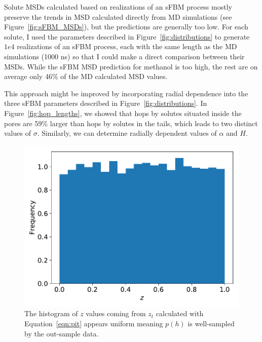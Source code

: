 \documentclass{article}
\begin{document}
  Solute MSDs calculated based on realizations of an sFBM process mostly
  preserve the trends in MSD calculated directly from MD simulations (see
  Figure~\ref{fig:sFBM_MSDs}), but the predictions are generally too low. 
  For each solute, I used the parameters described in Figure~\ref{fig:distributions}
  to generate $1e4$ realizations of an sFBM process, each with the same
  length as the MD simulations (1000 ns) so that I could make a direct 
  comparison between their MSDs. While the sFBM MSD prediction for methanol
  is too high, the rest are on average only 46\% of the MD calculated MSD
  values. 
  
  This approach might be improved by incorporating radial dependence into
  the three sFBM parameters described in Figure~\ref{fig:distributions}. 
  In Figure~\ref{fig:hop_lengths}, we showed that hops by solutes situated 
  inside the pores are 59\% larger than hops by solutes in the tails, which 
  leads to two distinct values of $\sigma$. Similarly, we can determine 
  radially dependent values of $\alpha$ and $H$. 
  
  \begin{figure}
  \centering
  \vspace{-0.5cm}
  \includegraphics[width=\linewidth]{z_histogram.pdf}
  \caption{The histogram of $z$ values coming from $z_t$ calculated with 
  Equation~\ref{eqn:pit} appears uniform meaning $p(h)$ is well-sampled 
  by the out-sample data.}\label{fig:z_histogram}
  \vspace{-1cm}
  \end{figure}
  
\end{document}
